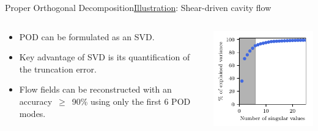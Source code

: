 \documentclass[usenames,dvipsnames,svgnames,10pt,aspectratio=169]{beamer}
\begin{document}
\begin{frame}[t, c]{Proper Orthogonal Decomposition}{\underline{Illustration}: Shear-driven cavity flow}
	\begin{columns}
		\begin{column}{.5\textwidth}
			\begin{itemize}
				\item POD can be formulated as an SVD.
				\bigskip
				\item Key advantage of SVD is its quantification of the truncation error.
				\bigskip
				\item Flow fields can be reconstructed with an accuracy~$\ge$~90\% using only the first 6 POD modes.
			\end{itemize}
			\vspace{1cm}
		\end{column}
		\begin{column}{.5\textwidth}
			\centering
			\includegraphics[width=.66\columnwidth]{svd_explained_variance}
		\end{column}
	\end{columns}
\end{frame}
\end{document}
